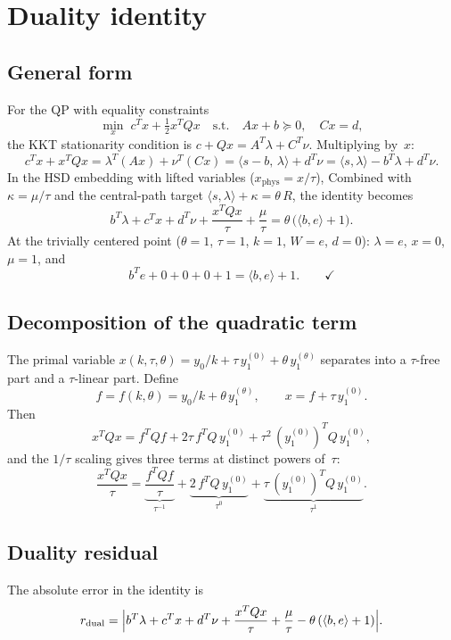\documentclass{article}
\begin{document}
\section{Duality identity}

\subsection{General form}

For the QP with equality constraints
\[
  \min_x\; c^T x + \tfrac{1}{2} x^T Q x
  \quad \text{s.t.}\quad Ax + b \succeq 0,\quad Cx = d,
\]
the KKT stationarity condition is $c + Qx = A^T\lambda + C^T\nu$.
Multiplying by~$x$:
\[
  c^T x + x^T Q x = \lambda^T(Ax) + \nu^T(Cx)
  = \langle s - b,\,\lambda\rangle + d^T\nu
  = \langle s,\lambda\rangle - b^T\lambda + d^T\nu.
\]
In the HSD embedding with lifted variables ($x_{\mathrm{phys}} = x/\tau$),
Combined with $\kappa = \mu/\tau$ and the central-path target
$\langle s,\lambda\rangle + \kappa = \theta\,R$, the identity becomes
\[
  \boxed{b^T \lambda + c^T x + d^T \nu
    + \frac{x^T Q x}{\tau} + \frac{\mu}{\tau}
    = \theta\,\bigl(\langle b, e\rangle + 1\bigr).}
\]
At the trivially centered point ($\theta = 1$, $\tau = 1$, $k = 1$,
$W = e$, $d = 0$): $\lambda = e$, $x = 0$, $\mu = 1$, and
\[
  b^T e + 0 + 0 + 0 + 1 = \langle b, e\rangle + 1. \qquad\checkmark
\]

\subsection{Decomposition of the quadratic term}

The primal variable $x(k, \tau, \theta) = y_0/k + \tau\,y_1^{(0)}
+ \theta\,y_1^{(\theta)}$ separates into a $\tau$-free part and a
$\tau$-linear part.  Define
\[
  f = f(k, \theta) = y_0/k + \theta\,y_1^{(\theta)},
  \qquad x = f + \tau\,y_1^{(0)}.
\]
Then
\[
  x^T Q x = f^T Q f + 2\tau\,f^T Q\,y_1^{(0)}
            + \tau^2\,(y_1^{(0)})^T Q\,y_1^{(0)},
\]
and the $1/\tau$ scaling gives three terms at distinct powers of~$\tau$:
\[
  \frac{x^T Q x}{\tau}
  = \underbrace{\frac{f^T Q f}{\tau}}_{\tau^{-1}}
  + \underbrace{2\,f^T Q\,y_1^{(0)}}_{\tau^0}
  + \underbrace{\tau\,(y_1^{(0)})^T Q\,y_1^{(0)}}_{\tau^1}.
\]

\subsection{Duality residual}

The absolute error in the identity is
\[
  r_{\mathrm{dual}} = \Bigl|b^T \lambda + c^T x + d^T\nu
    + \frac{x^T Q x}{\tau} + \frac{\mu}{\tau}
    - \theta\,(\langle b,e\rangle + 1)\Bigr|.
\]
\end{document}
